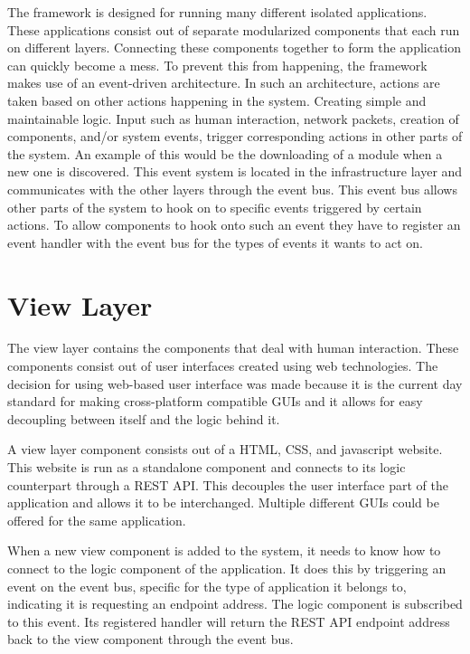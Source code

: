 
The framework is designed for running many different isolated applications. These applications consist out of separate modularized components that each run on different layers. Connecting these components together to form the application can quickly become a mess. To prevent this from happening, the framework makes use of an event-driven architecture. In such an architecture, actions are taken based on other actions happening in the system. Creating simple and maintainable logic. Input such as human interaction, network packets, creation of components, and/or system events, trigger corresponding actions in other parts of the system. An example of this would be the downloading of a module when a new one is discovered. This event system is located in the infrastructure layer and communicates with the other layers through the event bus. This event bus allows other parts of the system to hook on to specific events triggered by certain actions. To allow components to hook onto such an event they have to register an event handler with the event bus for the types of events it wants to act on.

\section{View Layer}


The view layer contains the components that deal with human interaction. These components consist out of user interfaces created using web technologies. The decision for using web-based user interface was made because it is the current day standard for making cross-platform compatible GUIs and it allows for easy decoupling between itself and the logic behind it.

A view layer component consists out of a HTML, CSS, and javascript website. This website is run as a standalone component and connects to its logic counterpart through a REST API. This decouples the user interface part of the application and allows it to be interchanged. Multiple different GUIs could be offered for the same application.

When a new view component is added to the system, it needs to know how to connect to the logic component of the application. It does this by triggering an event on the event bus, specific for the type of application it belongs to, indicating it is requesting an endpoint address. The logic component is subscribed to this event. Its registered handler will return the REST API endpoint address back to the view component through the event bus.

